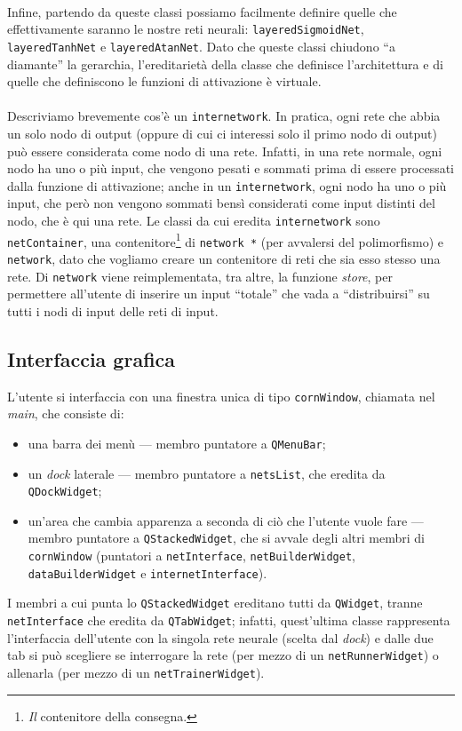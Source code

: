 \documentclass{article}
\begin{document}
\paragraph{} Infine, partendo da queste classi possiamo facilmente definire quelle che effettivamente saranno le nostre reti neurali: \texttt{layeredSigmoidNet}, \texttt{layeredTanhNet} e \texttt{layeredAtanNet}. Dato che queste classi chiudono “a diamante” la gerarchia, l'ereditarietà della classe che definisce l'architettura e di quelle che definiscono le funzioni di attivazione è virtuale.

\paragraph{} Descriviamo brevemente cos'è un \texttt{internetwork}. In pratica, ogni rete che abbia un solo nodo di output (oppure di cui ci interessi solo il primo nodo di output) può essere considerata come nodo di una rete. Infatti, in una rete normale, ogni nodo ha uno o più input, che vengono pesati e sommati prima di essere processati dalla funzione di attivazione; anche in un \texttt{internetwork}, ogni nodo ha uno o più input, che però non vengono sommati bensì considerati come input distinti del nodo, che è qui una rete. Le classi da cui eredita \texttt{internetwork} sono \texttt{netContainer}, una contenitore\footnote{\emph{Il} contenitore della consegna.} di \texttt{network *} (per avvalersi del polimorfismo) e \texttt{network}, dato che vogliamo creare un contenitore di reti che sia esso stesso una rete. Di \texttt{network} viene reimplementata, tra altre, la funzione \emph{store}, per permettere all'utente di inserire un input “totale” che vada a “distribuirsi” su tutti i nodi di input delle reti di input.

\subsection{Interfaccia grafica}

L'utente si interfaccia con una finestra unica di tipo \texttt{cornWindow}, chiamata nel \emph{main}, che consiste di:
\begin{itemize}
 	\item una barra dei menù --- membro puntatore a \texttt{QMenuBar};
 	\item un \emph{dock} laterale --- membro puntatore a \texttt{netsList}, che eredita da \texttt{QDockWidget};
 	\item un'area che cambia apparenza a seconda di ciò che l'utente vuole fare --- membro puntatore a \texttt{QStackedWidget}, che si avvale degli altri membri di \texttt{cornWindow} (puntatori a \texttt{netInterface}, \texttt{netBuilderWidget}, \texttt{dataBuilderWidget} e \texttt{internetInterface}).
 \end{itemize}
I membri a cui punta lo \texttt{QStackedWidget} ereditano tutti da \texttt{QWidget}, tranne \texttt{netInterface} che eredita da \texttt{QTabWidget}; infatti, quest'ultima classe rappresenta l'interfaccia dell'utente con la singola rete neurale (scelta dal \emph{dock}) e dalle due tab si può scegliere se interrogare la rete (per mezzo di un \texttt{netRunnerWidget}) o allenarla (per mezzo di un \texttt{netTrainerWidget}).
\end{document}
